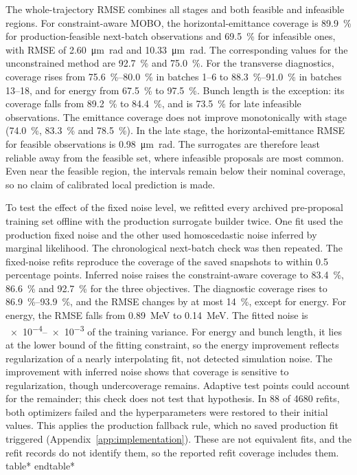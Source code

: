 \documentclass[aps,prab,reprint,superscriptaddress,amsmath,amssymb,floatfix]{revtex4-2}
\newcommand{\inputwide}[1]{\begingroup
  \expandafter\let\expandafter\table\csname table*\endcsname
  \expandafter\let\expandafter\endtable\csname endtable*\endcsname
  \endgroup}
\begin{document}
The whole-trajectory RMSE combines all stages and both feasible and infeasible regions. For
constraint-aware MOBO, the horizontal-emittance coverage is \SI{89.9}{\percent} for
production-feasible next-batch observations and \SI{69.5}{\percent} for infeasible ones, with
RMSE of \SI{2.60}{\micro\metre\radian} and \SI{10.33}{\micro\metre\radian}. The corresponding
values for the unconstrained method are \SI{92.7}{\percent} and \SI{75.0}{\percent}. For the
transverse diagnostics, coverage rises from \SIrange{75.6}{80.0}{\percent} in batches 1--6 to
\SIrange{88.3}{91.0}{\percent} in batches 13--18, and for energy from \SI{67.5}{\percent} to
\SI{97.5}{\percent}. Bunch length is the exception: its coverage falls from \SI{89.2}{\percent}
to \SI{84.4}{\percent}, and is \SI{73.5}{\percent} for late infeasible observations. The
emittance coverage does not improve monotonically with stage (\SI{74.0}{\percent},
\SI{83.3}{\percent} and \SI{78.5}{\percent}). In the late stage, the horizontal-emittance RMSE
for feasible observations is \SI{0.98}{\micro\metre\radian}. The surrogates are therefore least
reliable away from the feasible set, where infeasible proposals are most common. Even near the
feasible region, the intervals remain below their nominal coverage, so no claim of calibrated
local prediction is made.

To test the effect of the fixed noise level, we refitted every archived pre-proposal training set offline with
the production surrogate builder twice. One fit used the production fixed noise and the
other used homoscedastic noise inferred by marginal likelihood. The chronological
next-batch check was then repeated. The fixed-noise refits reproduce the coverage of the
saved snapshots to within \num{0.5} percentage points. Inferred noise raises the
constraint-aware coverage to \SI{83.4}{\percent}, \SI{86.6}{\percent} and
\SI{92.7}{\percent} for the three objectives. The diagnostic coverage rises to
\SIrange{86.9}{93.9}{\percent}, and the RMSE changes by at most \SI{14}{\percent},
except for energy. For energy, the RMSE falls from \SI{0.89}{\mega\electronvolt} to
\SI{0.14}{\mega\electronvolt}. The fitted noise is \numrange{e-4}{e-3} of the training
variance. For energy and bunch length, it lies at the lower bound of the fitting
constraint, so the energy improvement reflects regularization of a nearly
interpolating fit, not detected simulation noise. The improvement with inferred noise shows that
coverage is sensitive to regularization, though
undercoverage remains. Adaptive test points could account for the
remainder; this check does not test that hypothesis.
In \num{88} of \num{4680} refits, both optimizers failed and the hyperparameters were
restored to their initial values. This applies the production fallback rule, which no saved
production fit triggered (Appendix~\ref{app:implementation}). These are not equivalent fits, and the
refit records do not identify them, so the reported refit coverage includes them.
\FloatBarrier
\inputwide{revisions/evidence/c08_settings}
\FloatBarrier
\end{document}
